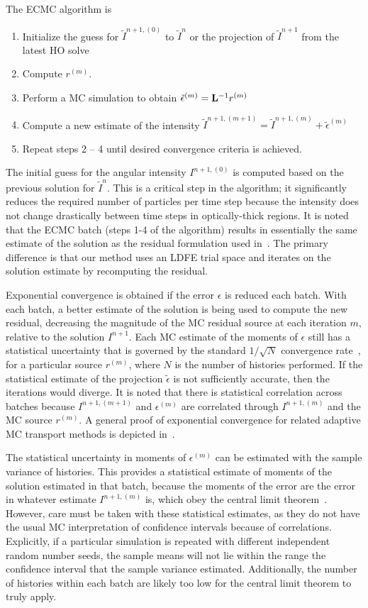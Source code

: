 The ECMC algorithm is
\begin{enumerate}
    \item Initialize the guess for $\tilde{I}^{n+1,(0)}$ to $\tilde{I}^{n}$ or the
        projection of $\tilde{I}^{n+1}$ from the latest HO solve
\item Compute $r^{(m)}$.
\item Perform a MC simulation to obtain $\tilde{\epsilon}^{(m)} = \mathbf{L}^{-1} r^{(m)}$
\item Compute a new estimate of the intensity $\tilde I^{n+1,(m+1)} = \tilde I^{n+1,(m)}
+ \tilde\epsilon^{(m)}$
\item Repeat steps 2 -- 4 until desired convergence criteria is achieved. 
\end{enumerate}
The initial guess for the angular intensity $I^{n+1,(0)}$ is computed based on the previous solution
for $\tilde{I}^{n}$. This is a critical step in the algorithm; it significantly reduces the required number of
particles per time step because the intensity does not change drastically between time steps in
optically-thick regions.  It is noted that the ECMC batch (steps 1-4 of the
algorithm) results in essentially the same estimate of the solution as the residual
formulation used in~\cite{rmc}.  The primary difference is that our method uses an LDFE trial
space and iterates on the solution estimate by recomputing the residual.

Exponential convergence is obtained if the error $\epsilon$ is reduced each batch.  With each batch, a
better estimate of the solution is being used to compute the new residual, decreasing
the magnitude of the MC residual source at each iteration $m$, relative to the solution
$I^{n+1}$.  Each MC
estimate of the moments of $\epsilon$ still has a statistical uncertainty that is
governed by the standard $1/\sqrt{N}$ convergence rate~\cite{shultis_mc}, for a
particular source $r^{(m)}$, where $N$ is the number of histories performed.  If the statistical estimate of the projection $\tilde\epsilon$ is not sufficiently
accurate, then the iterations would diverge. It is noted that there is statistical correlation across batches because
$I^{n+1,(m+1)}$ and $\epsilon^{(m)}$ are correlated through $I^{n+1,(m)}$ and the MC source $r^{(m)}$.  
A general proof of exponential
convergence for related adaptive MC transport methods is depicted in~\cite{spanier_mc}.  

The statistical uncertainty in moments of $\epsilon^{(m)}$ can be estimated with the sample variance of
histories.  This provides a statistical estimate of moments of the solution estimated in
that batch, because the moments of the error are the error in whatever estimate
$I^{n+1,(m)}$ is, which obey the central limit theorem~\cite{shultis_mc}.  However, care
must be taken with these statistical estimates, as they do not have the usual MC
interpretation of confidence intervals because of correlations.  Explicitly, if a
particular simulation is repeated with different independent random number seeds, the
sample means will not lie within the range the confidence interval that the sample
variance estimated.  Additionally, the number of histories within each batch are likely
too low for the central limit theorem to truly apply.  

